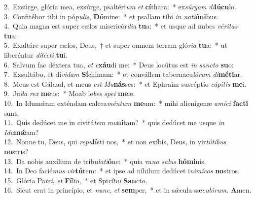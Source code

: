 {2.~}Exsúrge, glória mea, exsúrge, psaltéri\textit{um} \textit{et} \textbf{cí}thara:~* ex\textit{súr}\textit{gam} \textit{di}\textbf{lú}\textbf{cu}lo.\\
{3.~}Confitébor tibi in pó\textit{pu}\textit{lis}, \textbf{Dó}mine:~* et psallam tibi \textit{in} \textit{na}\textit{ti}\textbf{ó}\textbf{ni}bus.\\
{4.~}Quia magna est super cælos misericór\textit{di}\textit{a} \textbf{tu}a:~* et usque ad nubes \textit{vé}\textit{ri}\textit{tas} \textbf{tu}a:\\
{5.~}Exaltáre super cælos, Deus,~† et super omnem terram gló\textit{ri}\textit{a} \textbf{tu}a:~* ut liberéntur \textit{di}\textit{lé}\textit{cti} \textbf{tu}i.\\
{6.~}Salvum fac déxtera tua, \textit{et} \textit{e}\textbf{xáu}di me:~* Deus locútus est \textit{in} \textit{san}\textit{cto} \textbf{su}o:\\
{7.~}Exsultábo, et dí\textit{vi}\textit{dam} \textbf{Sí}chimam:~* et convállem tabernacu\textit{ló}\textit{rum} \textit{di}\textbf{mé}\textbf{ti}ar.\\
{8.~}Meus est Gálaad, et meus \textit{est} \textit{Ma}\textbf{nás}ses:~* et Ephraim suscéptio \textit{cá}\textit{pi}\textit{tis} \textbf{me}i.\\
{9.~}Ju\textit{da} \textit{rex} \textbf{me}us:~* Moab le\textit{bes} \textit{spe}\textit{i} \textbf{me}æ.\\
{10.~}In Idumǽam exténdam calcea\textit{mén}\textit{tum} \textbf{me}um:~* mihi alienígenæ \textit{a}\textit{mí}\textit{ci} \textbf{fa}\textbf{cti} sunt.\\
{11.~}Quis dedúcet me in civitá\textit{tem} \textit{mu}\textbf{ní}tam?~* quis dedúcet me usque \textit{in} \textit{I}\textit{du}\textbf{mǽ}am?\\
{12.~}Nonne tu, Deus, qui \textit{re}\textit{pu}\textbf{lí}sti nos,~* et non exíbis, Deus, in vir\textit{tú}\textit{ti}\textit{bus} \textbf{no}stris?\\
{13.~}Da nobis auxílium de tribu\textit{la}\textit{ti}\textbf{ó}ne:~* quia va\textit{na} \textit{sa}\textit{lus} \textbf{hó}\textbf{mi}nis.\\
{14.~}In Deo facié\textit{mus} \textit{vir}\textbf{tú}tem:~* et ipse ad níhilum dedúcet i\textit{ni}\textit{mí}\textit{cos} \textbf{no}stros.\\
{15.~}Glória Pa\textit{tri}, \textit{et} \textbf{Fí}lio,~* et Spi\textit{rí}\textit{tu}\textit{i} \textbf{San}cto.\\
{16.~}Sicut erat in princípio, et \textit{nunc}, \textit{et} \textbf{sem}per,~* et in sǽcula sæ\textit{cu}\textit{ló}\textit{rum}. \textbf{A}men.\\
